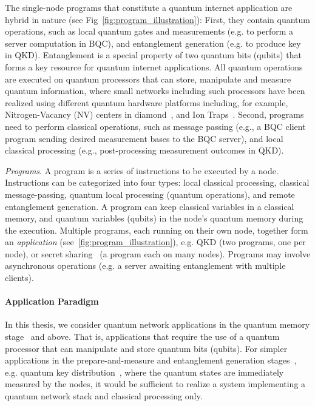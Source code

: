 The single-node programs that constitute a quantum internet application are hybrid in nature (see Fig~\ref{fig:program_illustration}):
First, they contain quantum operations, such as local quantum gates and measurements (e.g. to perform a server computation in BQC), and entanglement generation (e.g. to produce key in QKD). Entanglement is a special property of two quantum bits (qubits) that forms a key resource for quantum internet applications. 
All quantum operations are executed on quantum processors that can store, manipulate and measure quantum information, where small networks including such processors have been realized using different quantum hardware platforms including, for example,  Nitrogen-Vacancy (NV) centers in diamond~\cite{pompili2021realization}, and Ion Traps~\cite{krutyanskiy2023entanglement}.
Second, programs need to perform classical operations, such as message passing (e.g., a BQC client program sending desired measurement bases to the BQC server), and local classical processing (e.g., post-processing measurement outcomes in QKD).


\textit{Programs}.
A program is a series of instructions to be executed by a node.
Instructions can be categorized into four types: local classical processing, classical message-passing, quantum local processing (quantum operations), and remote entanglement generation.
A program can keep classical variables in a classical memory, and quantum variables (qubits) in the node's quantum memory during the execution.
Multiple programs, each running on their own node, together form an \textit{application} (see~\ref{fig:program_illustration}), e.g. QKD (two programs, one per node),
or secret sharing~\cite{hillery1999quantum} (a program each on many nodes).
Programs may involve asynchronous operations (e.g. a server awaiting entanglement with multiple clients).

\paragraph{Application Paradigm}

In this thesis, we consider quantum network applications in the quantum memory stage~\cite{wehner_2018_stages} and above. That is, applications that require the use of a quantum processor that can manipulate and store quantum bits (qubits). For simpler applications in the prepare-and-measure and entanglement generation stages~\cite{wehner_2018_stages}, e.g. quantum key distribution~\cite{bb84Original,ekert_1991_e91}, where the quantum states are immediately measured by the nodes, it would be sufficient to realize a system implementing a quantum network stack and classical processing only.

